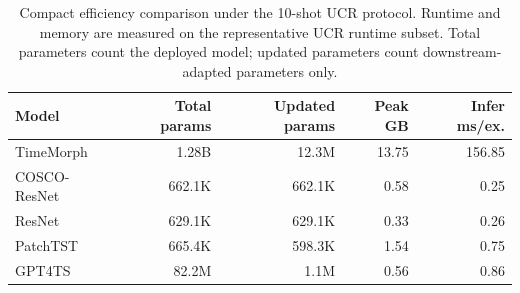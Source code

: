 \begin{table}[t]
\centering
\caption{Compact efficiency comparison under the 10-shot UCR protocol. Runtime and memory are measured on the representative UCR runtime subset. Total parameters count the deployed model; updated parameters count downstream-adapted parameters only.}
\label{tab:efficiency-compact}
\begin{tabular}{lrrrr}
\toprule
Model & Total params & Updated params & Peak GB & Infer ms/ex. \\
\midrule
TimeMorph & 1.28B & 12.3M & 13.75 & 156.85 \\
COSCO-ResNet & 662.1K & 662.1K & 0.58 & 0.25 \\
ResNet & 629.1K & 629.1K & 0.33 & 0.26 \\
PatchTST & 665.4K & 598.3K & 1.54 & 0.75 \\
GPT4TS & 82.2M & 1.1M & 0.56 & 0.86 \\
\bottomrule
\end{tabular}
\end{table}
